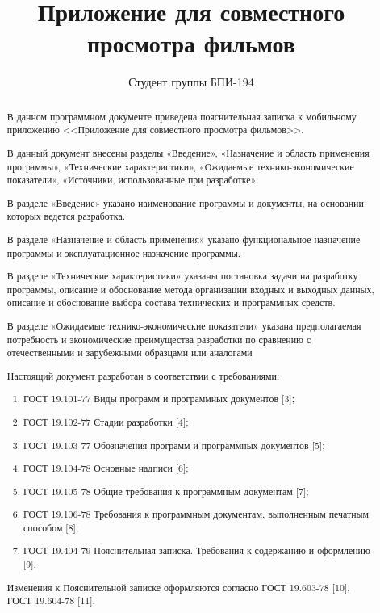 \documentclass{../includes/TechDoc}
\title{Приложение для совместного просмотра фильмов}
\author{Студент группы БПИ-194}{В. А. Анненков}
\begin{document}
    \maketitle

    \begin{abstract}
        В данном программном документе приведена пояснительная записка к мобильному приложению <<Приложение для совместного просмотра фильмов>>.

        В данный документ внесены разделы «Введение», «Назначение и область применения программы», «Технические характеристики», «Ожидаемые технико-экономические показатели», «Источники, использованные при разработке».

        В разделе «Введение» указано наименование программы и документы, на основании которых ведется разработка.

        В разделе «Назначение и область применения» указано функциональное назначение программы и эксплуатационное назначение программы.

        В разделе «Технические характеристики» указаны постановка задачи на разработку программы, описание и обоснование метода организации входных и выходных данных, описание и обоснование выбора состава технических и программных средств.

        В разделе «Ожидаемые технико-экономические показатели» указана предполагаемая потребность и экономические преимущества разработки по сравнению с отечественными и зарубежными образцами или аналогами

        Настоящий документ разработан в соответствии с требованиями:
        \begin{enumerate}
            \item ГОСТ 19.101-77 Виды программ и программных документов [3];
            \item ГОСТ 19.102-77 Стадии разработки [4];
            \item ГОСТ 19.103-77 Обозначения программ и программных документов [5];
            \item ГОСТ 19.104-78 Основные надписи [6];
            \item ГОСТ 19.105-78 Общие требования к программным документам [7];
            \item ГОСТ 19.106-78 Требования к программным документам, выполненным печатным способом [8];
            \item ГОСТ 19.404-79 Пояснительная записка.
            Требования к содержанию и оформлению [9].
        \end{enumerate}
        Изменения к Пояснительной записке оформляются согласно ГОСТ 19.603-78 [10], ГОСТ 19.604-78 [11].
    \end{abstract}
\end{document}
